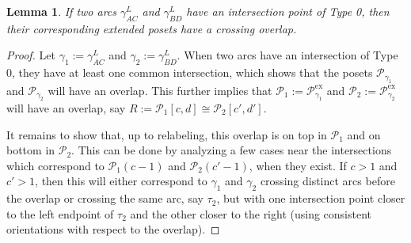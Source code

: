 \documentclass[12pt, letterpaper,table]{amsart}
\newtheorem{lemma}[theorem]{Lemma}
\theoremstyle{remark}
\newcommand{\calP}{\mathcal{P}}
\newcommand{\exx}{\mathrm{ex}}
\begin{document}

\begin{lemma}\label{lem:Type0GoesThrough}
If two arcs $\gamma_{AC}^{L}$ and $\gamma_{BD}^{L}$ have an intersection point of Type 0, then their corresponding extended posets have a crossing overlap.
\end{lemma}

\begin{proof}
Let $\gamma_1:= \gamma_{AC}^{L}$ and $\gamma_2:= \gamma_{BD}^{L}$. When two arcs have an intersection of Type 0, they have at least one common intersection, which shows that the posets $\calP_{\gamma_1}$ and $\calP_{\gamma_2}$ will have an overlap. This further implies that $\calP_1:=\calP^\exx_{\gamma_1}$ and $\calP_2:=\calP^\exx_{\gamma_2}$ will have an overlap, say $R:=\calP_1[c,d] \cong \calP_2[c',d']$.

It remains to show that, up to relabeling, this overlap is on top in $\calP_1$ and on bottom in $\calP_2$. This can be done by analyzing a few cases near the intersections which correspond to $\calP_1(c-1)$ and $\calP_2(c'-1)$, when they exist. If $c>1$ and $c'>1$, then this will either correspond to  $\gamma_1$ and $\gamma_2$ crossing distinct arcs before the overlap or crossing the same arc, say $\tau_2$, but with one intersection point closer to the left endpoint of $\tau_2$ and the other closer to the right (using consistent orientations with respect to the overlap). 


\end{proof}
\end{document}
